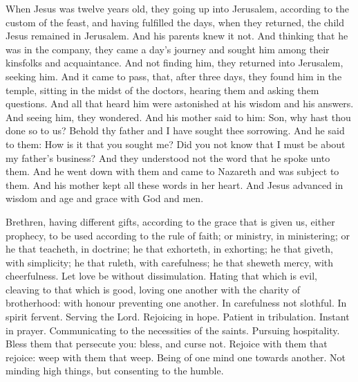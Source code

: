 When Jesus was twelve years old, they going up into Jerusalem, according to
the custom of the feast, and having fulfilled the days, when they returned, the
child Jesus remained in Jerusalem. And his parents knew it not.  And thinking
that he was in the company, they came a day's journey and sought him among
their kinsfolks and acquaintance.  And not finding him, they returned into
Jerusalem, seeking him.  And it came to pass, that, after three days, they
found him in the temple, sitting in the midst of the doctors, hearing them and
asking them questions.  And all that heard him were astonished at his wisdom
and his answers.  And seeing him, they wondered. And his mother said to him:
Son, why hast thou done so to us? Behold thy father and I have sought thee
sorrowing.  And he said to them: How is it that you sought me? Did you not know
that I must be about my father's business?  And they understood not the word
that he spoke unto them.  And he went down with them and came to Nazareth and
was subject to them. And his mother kept all these words in her heart.  And
Jesus advanced in wisdom and age and grace with God and men.






Brethren, having different gifts, according to the grace that is given us, either
prophecy, to be used according to the rule of faith; or ministry, in
ministering; or he that teacheth, in doctrine; he that exhorteth, in exhorting;
he that giveth, with simplicity; he that ruleth, with carefulness; he that
sheweth mercy, with cheerfulness.  Let love be without dissimulation. Hating
that which is evil, cleaving to that which is good, loving one another with the
charity of brotherhood: with honour preventing one another.  In carefulness not
slothful. In spirit fervent. Serving the Lord.  Rejoicing in hope. Patient in
tribulation. Instant in prayer.  Communicating to the necessities of the
saints. Pursuing hospitality.  Bless them that persecute you: bless, and curse
not.  Rejoice with them that rejoice: weep with them that weep.  Being of one
mind one towards another. Not minding high things, but consenting to the
humble.%



